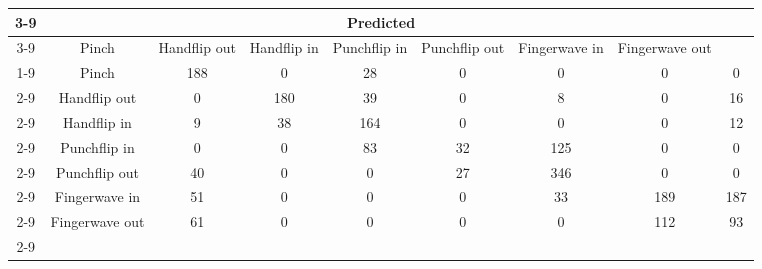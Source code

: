 \documentclass{standalone}
\begin{document}
 
 \begin{tabular}{|c |c |c |c |c |c |c |c |c |}
\cline{3-9}\multicolumn{2}{c|}{} & \multicolumn{7}{c|}{Predicted} \\ 
\cline{3-9} \multicolumn{2}{c |}{ } & Pinch & Handflip out & Handflip in & Punchflip in & Punchflip out & Fingerwave in & Fingerwave out\\ 
\cline{1-9}\multirow{7}{*}{\rotatebox[origin=c]{90}{Actual}} & Pinch & 188 & 0 & 28 & 0 & 0 & 0 & 0\\ 
 \cline{2-9} & Handflip out & 0 & 180 & 39 & 0 & 8 & 0 & 16\\ 
 \cline{2-9} & Handflip in & 9 & 38 & 164 & 0 & 0 & 0 & 12\\ 
 \cline{2-9} & Punchflip in & 0 & 0 & 83 & 32 & 125 & 0 & 0\\ 
 \cline{2-9} & Punchflip out & 40 & 0 & 0 & 27 & 346 & 0 & 0\\ 
 \cline{2-9} & Fingerwave in & 51 & 0 & 0 & 0 & 33 & 189 & 187\\ 
 \cline{2-9} & Fingerwave out & 61 & 0 & 0 & 0 & 0 & 112 & 93\\ 
 \cline{2-9}\hline \end{tabular}
 
\end{document}
